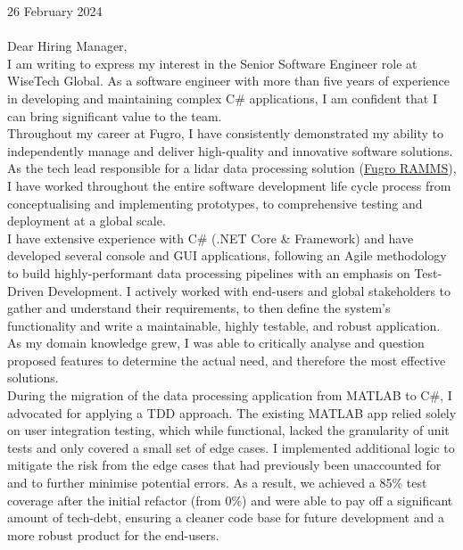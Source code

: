 \vspace{30pt}

26 February 2024 \\ \\

Dear Hiring Manager, \\

I am writing to express my interest in the Senior Software Engineer role at WiseTech Global. As a software engineer with more than five years of experience in developing and maintaining complex C\# applications, I am confident that I can bring significant value to the team. \\

Throughout my career at Fugro, I have consistently demonstrated my ability to independently manage and deliver high-quality and innovative software solutions. As the tech lead responsible for a lidar data processing solution (\href{https://www.youtube.com/watch?v=f65bdm4tous}{\underline{Fugro RAMMS}}), I have worked throughout the entire software development life cycle process from conceptualising and implementing prototypes, to comprehensive testing and deployment at a global scale. \\

I have extensive experience with C\# (.NET Core \& Framework) and have developed several console and GUI applications, following an Agile methodology to build highly-performant data processing pipelines with an emphasis on Test-Driven Development. I actively worked with end-users and global stakeholders to gather and understand their requirements, to then define the system's functionality and write a maintainable, highly testable, and robust application. As my domain knowledge grew, I was able to critically analyse and question proposed features to determine the actual need, and therefore the most effective solutions. \\

During the migration of the data processing application from MATLAB to C\#, I advocated for applying a TDD approach. The existing MATLAB app relied solely on user integration testing, which while functional, lacked the granularity of unit tests and only covered a small set of edge cases. I implemented additional logic to mitigate the risk from the edge cases that had previously been unaccounted for and to further minimise potential errors. As a result, we achieved a 85\% test coverage after the initial refactor (from 0\%) and were able to pay off a significant amount of tech-debt, ensuring a cleaner code base for future development and a more robust product for the end-users.\\

